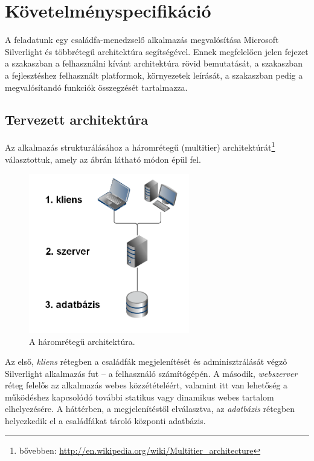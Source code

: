 \chapter{Követelményspecifikáció}\label{sect:kovspec}

A feladatunk egy családfa-menedzselő alkalmazás megvalósítása Microsoft Silverlight és többrétegű architektúra segítségével. Ennek megfelelően jelen fejezet a  szakaszban a felhasználni kívánt architektúra rövid bemutatását, a  szakaszban a fejlesztéshez felhasznált platformok, környezetek leírását, a  szakaszban pedig a megvalósítandó funkciók összegzését tartalmazza.

\section{Tervezett architektúra}\label{sect:tervarch}

Az alkalmazás strukturálásához a háromrétegű (multitier) architektúrát\footnote{bővebben: \url{http://en.wikipedia.org/wiki/Multitier\_architecture}} választottuk, amely az  ábrán látható módon épül fel.

\begin{figure}[!ht]
\centering
\includegraphics[width=70mm, keepaspectratio]{figures/architektura.png}
\caption{A háromrétegű architektúra.}
\label{fig:haromreteg}
\end{figure}

Az első, \emph{kliens} rétegben a családfák megjelenítését és adminisztrálását végző Silverlight alkalmazás fut -- a felhasználó számítógépén. A második, \emph{webszerver} réteg felelős az alkalmazás webes közzétételéért, valamint itt van lehetőség a működéshez kapcsolódó további statikus vagy dinamikus webes tartalom elhelyezésére. A háttérben, a megjelenítéstől elválasztva, az \emph{adatbázis} rétegben helyezkedik el a családfákat tároló központi adatbázis.

